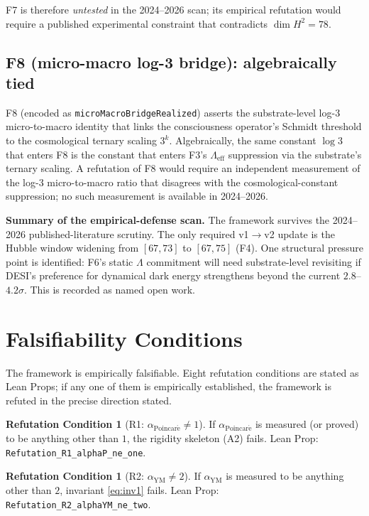 \documentclass[11pt,a4paper]{article}
\theoremstyle{definition}
\newtheorem{refutation}[theorem]{Refutation Condition}
\theoremstyle{remark}
\newcommand{\Lambdaeff}{\Lambda_{\mathrm{eff}}}
\newcommand{\alphaYM}{\alpha_{\mathrm{YM}}}
\newcommand{\alphaP}{\alpha_{\mathrm{Poincar\acute{e}}}}
\newcommand{\lean}[1]{\texttt{\small #1}}
\begin{document}
F7 is therefore \emph{untested} in the 2024--2026 scan;
its empirical refutation would require a published
experimental constraint that contradicts $\dim H^{2} = 78$.

\subsection{F8 (micro-macro log-3 bridge): algebraically tied}
\label{sec:f8-tied}

F8 (encoded as \lean{microMacroBridgeRealized}) asserts the
substrate-level log-3 micro-to-macro identity that links the
consciousness operator's Schmidt threshold to the cosmological
ternary scaling $3^{k}$. Algebraically, the same constant
$\log 3$ that enters F8 is the constant that enters F3's
$\Lambdaeff$ suppression via the substrate's ternary scaling.
A refutation of F8 would require an independent measurement of
the log-3 micro-to-macro ratio that disagrees with the
cosmological-constant suppression; no such measurement is
available in 2024--2026.

\medskip
\noindent\textbf{Summary of the empirical-defense scan.} The
framework survives the 2024--2026 published-literature scrutiny.
The only required v1$\to$v2 update is the Hubble window widening
from $[67, 73]$ to $[67, 75]$ (F4). One structural pressure
point is identified: F6's static $\Lambda$ commitment will need
substrate-level revisiting if DESI's preference for dynamical
dark energy strengthens beyond the current $2.8$--$4.2\sigma$.
This is recorded as named open work.

\section{Falsifiability Conditions}
\label{sec:falsifiability}

The framework is empirically falsifiable. Eight refutation
conditions are stated as Lean Props; if any one of them is
empirically established, the framework is refuted in the precise
direction stated.

\begin{refutation}[R1: $\alphaP \ne 1$]
If $\alphaP$ is measured (or proved) to be anything other than
$1$, the rigidity skeleton (A2) fails. Lean Prop:
\lean{Refutation\_R1\_alphaP\_ne\_one}.
\end{refutation}

\begin{refutation}[R2: $\alphaYM \ne 2$]
If $\alphaYM$ is measured to be anything other than $2$, invariant
\eqref{eq:inv1} fails. Lean Prop:
\lean{Refutation\_R2\_alphaYM\_ne\_two}.
\end{refutation}
\end{document}
